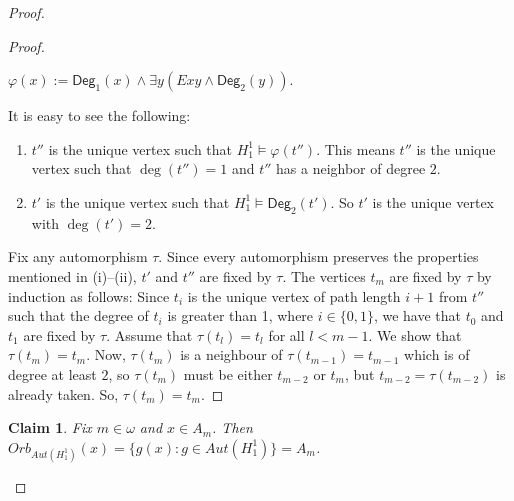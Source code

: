 \documentclass[12pt,reqno,a4paper]{amsart}
\theoremstyle{definition}
\newtheorem{claim}[defn]{Claim}
\begin{document}
\begin{proof}
\begin{proof}
			\begin{flushleft}
				$\varphi(x) := \mathsf{Deg}_1(x)\wedge \exists y(Exy \wedge \mathsf{Deg}_2(y))$.
			\end{flushleft}
			
			It is easy to see the following:
			
			\begin{enumerate}
				\item[(i)] $t''$ is the unique vertex such that $H_1^1\models \varphi(t'')$. This means $t''$ is the unique vertex such that $\deg(t'')=1$ and $t''$ has a neighbor of degree $2$.
				\item[(ii)] $t'$ is the unique vertex such that $H_1^1\models  \mathsf{Deg}_2(t')$. So $t'$ is the unique vertex with $\deg(t')= 2$.
			\end{enumerate}
			Fix any automorphism $\tau$. Since every automorphism preserves the properties mentioned in (i)--(ii), $t'$ and $t''$ are fixed by $\tau$. 
			The vertices $t_{m}$ are fixed by $\tau$ by induction as follows: Since $t_{i}$ is the unique vertex of path length $i+1$ from $t''$ such that the degree of $t_{i}$ is greater than 1, where $i\in \{0,1\}$, we have that $t_{0}$ and $t_{1}$ are fixed by $\tau$.
			Assume that $\tau(t_{l})=t_{l}$ for all $l<m-1$. We show that $\tau(t_{m})=t_{m}$. Now, $\tau(t_{m})$ is a neighbour of $\tau(t_{m-1}) = t_{m-1}$ which is of degree at least $2$, so $\tau(t_{m})$ must be either $t_{m-2}$ or $t_{m}$, but $t_{m-2} = \tau(t_{m-2})$ is already taken. So, $\tau(t_{m})=t_{m}$.
		\end{proof}
		
		\begin{claim}
			{\em Fix $m\in \omega$ and $x\in A_m$. Then $Orb_{Aut(H_1^1)}(x)=\{g(x): g\in Aut(H_1^1)\}=A_m$.} 
		\end{claim}
		

\end{proof}
\end{document}
